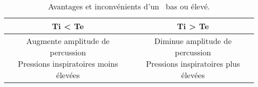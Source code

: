 \begin{table*}
	\centering
	\caption{Avantages et inconvénients d'un \ie\ bas ou élevé.}
	\begin{tabular}{cc}
		\hline
		Ti < Te & Ti > Te\\
		\hline
		\parbox{17em}{
			\raggedright
			Augmente amplitude de percussion\\
			Pressions inspiratoires moins élevées
			} & \parbox{16em}{
				\raggedright
				Diminue amplitude de percussion\\
				Pressions inspiratoires plus élevées
				}\\
				\hline
	\end{tabular}
\end{table*}
